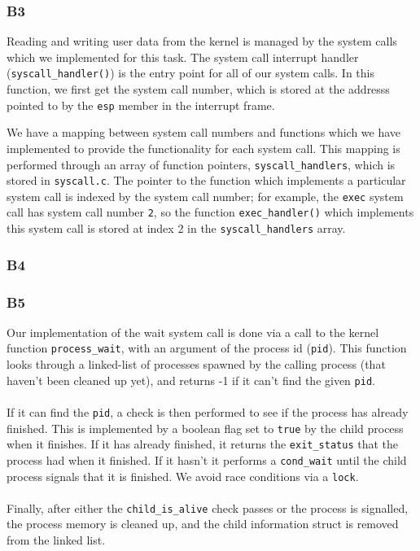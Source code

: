 \documentclass[a4wide, 11pt]{article}
\newcommand{\tx}{\texttt}
\begin{document}
\subsubsection{B3}

Reading and writing user data from the kernel is managed by the system calls which we implemented for this task. The system call interrupt handler (\tx{syscall\_handler()}) is the entry point for all of our system calls. In this function, we first get the system call number, which is stored at the addresss pointed to by the \tx{esp} member in the interrupt frame.

We have a mapping between system call numbers and functions which we have implemented to provide the functionality for each system call. This mapping is performed through an array of function pointers, \tx{syscall\_handlers}, which is stored in \tx{syscall.c}. The pointer to the function which implements a particular system call is indexed by the system call number; for example, the \tx{exec} system call has system call number \tx{2}, so the function \tx{exec\_handler()} which implements this system call is stored at index 2 in the \tx{syscall\_handlers} array.
\subsubsection{B4}

\subsubsection{B5}

Our implementation of the wait system call is done via a call to the kernel function \texttt{process\_wait}, with an argument of the process id (\texttt{pid}). This function looks through a linked-list of processes spawned by the calling process (that haven't been cleaned up yet), and returns -1 if it can't find the given \texttt{pid}.
\\\\
If it can find the \texttt{pid}, a check is then performed to see if the process has already finished. This is implemented by a boolean flag set to \texttt{true} by the child process when it finishes. If it has already finished, it returns the \texttt{exit\_status} that the process had when it finished. If it hasn't it performs a \texttt{cond\_wait} until the child process signals that it is finished. We avoid race conditions via a \texttt{lock}.
\\\\
Finally, after either the \texttt{child\_is\_alive} check passes or the process is signalled, the process memory is cleaned up, and the child information struct is removed from the linked list.
\end{document}
